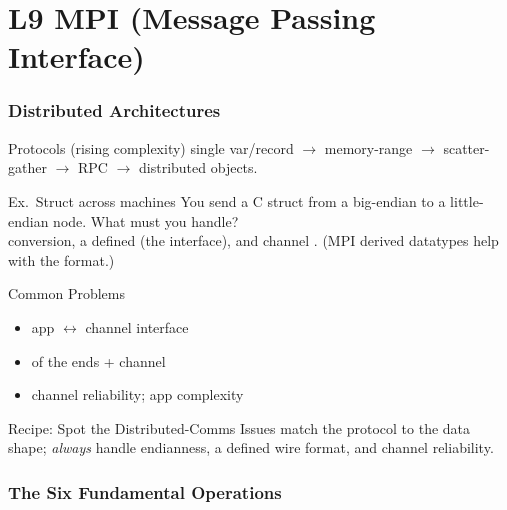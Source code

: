 \section{L9 MPI (Message Passing Interface)}

\subsubsection{Distributed Architectures}


\begin{definition}{Protocols (rising complexity)}
    single var/record $\to$ memory-range $\to$ scatter-gather $\to$ RPC $\to$ distributed objects.
\end{definition}

\begin{example2}{Ex.\ Struct across machines}
    You send a C struct from a big-endian to a little-endian node. What must you handle?
     \\ 
     conversion, a defined  (the interface), and channel . (MPI derived datatypes help with the format.)
\end{example2}

\begin{definition}{Common Problems}
    \begin{itemize}
        \item app $\leftrightarrow$ channel interface
        \item {} of the ends + channel
        \item channel reliability; app complexity
    \end{itemize}
\end{definition}

\begin{KR}{Recipe: Spot the Distributed-Comms Issues}
    match the protocol to the data shape; \emph{always} handle endianness, a defined wire format, and channel reliability.
\end{KR}



\multend





\subsubsection{The Six Fundamental Operations}


